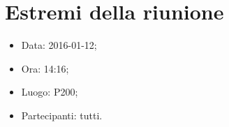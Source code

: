 \documentclass[../template.tex]{subfiles}
\begin{document}
\section{Estremi della riunione}
	\begin{itemize}
		\item Data: 2016-01-12;
		\item Ora: 14:16;
		\item Luogo: P200;
		\item Partecipanti: tutti.
	\end{itemize}
\end{document}
